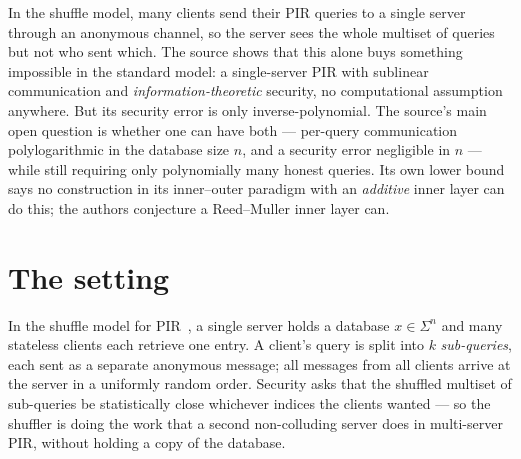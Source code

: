 \documentclass{aicr-conjecture}
\newcommand{\Sig}{\Sigma}
\begin{document}

\vspace{0.4em}

\begin{informalconjecture}
In the shuffle model, many clients send their PIR queries to a single
server through an anonymous channel, so the server sees the whole
multiset of queries but not who sent which. The source shows that this
alone buys something impossible in the standard model: a single-server
PIR with sublinear communication and \emph{information-theoretic}
security, no computational assumption anywhere. But its security error
is only inverse-polynomial. The source's main open question is whether
one can have both --- per-query communication polylogarithmic in the
database size $n$, and a security error negligible in $n$ --- while
still requiring only polynomially many honest queries. Its own lower
bound says no construction in its inner--outer paradigm with an
\emph{additive} inner layer can do this; the authors conjecture a
Reed--Muller inner layer can.
\end{informalconjecture}

\section{The setting}\label{sec:setting}

In the shuffle model for PIR~\cite{IKOS06,GIK+24}, a single server holds
a database $x \in \Sig^{n}$ and many stateless clients each retrieve one
entry. A client's query is split into $k$ \emph{sub-queries}, each sent
as a separate anonymous message; all messages from all clients arrive at
the server in a uniformly random order. Security asks that the shuffled
multiset of sub-queries be statistically close whichever indices the
clients wanted --- so the shuffler is doing the work that a second
non-colluding server does in multi-server PIR, without holding a copy of
the database.
\end{document}
